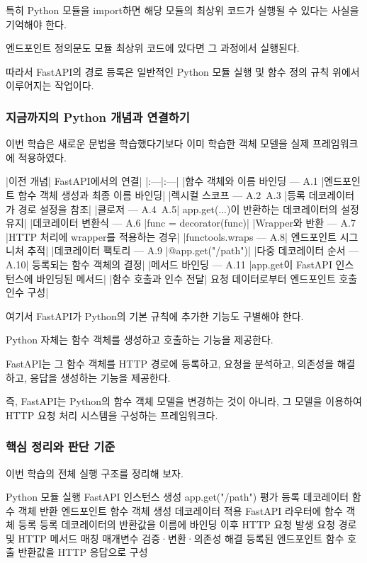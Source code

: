 특히 Python 모듈을 import하면 해당 모듈의 최상위 코드가 실행될 수 있다는 사실을 기억해야 한다.

엔드포인트 정의문도 모듈 최상위 코드에 있다면 그 과정에서 실행된다.

따라서 FastAPI의 경로 등록은 일반적인 Python 모듈 실행 및 함수 정의 규칙 위에서 이루어지는 작업이다.

\subsubsection{지금까지의 Python 개념과 연결하기}

이번 학습은 새로운 문법을 학습했다기보다 이미 학습한 객체 모델을 실제 프레임워크에 적용하였다.

\begin{dhktable}
|이전 개념|	FastAPI에서의 연결|
|:---|:---|
|함수 객체와 이름 바인딩 — A.1	|엔드포인트 함수 객체 생성과 최종 이름 바인딩|
|렉시컬 스코프 — A.2~A.3	|등록 데코레이터가 경로 설정을 참조|
|클로저 — A.4~A.5|	app.get(...)이 반환하는 데코레이터의 설정 유지|
|데코레이터 변환식 — A.6	|func = decorator(func)|
|Wrapper와 반환 — A.7	|HTTP 처리에 wrapper를 적용하는 경우|
|functools.wraps — A.8|	엔드포인트 시그니처 추적|
|데코레이터 팩토리 — A.9	|@app.get("/path")|
|다중 데코레이터 순서 — A.10|	등록되는 함수 객체의 결정|
|메서드 바인딩 — A.11	|app.get이 FastAPI 인스턴스에 바인딩된 메서드|
|함수 호출과 인수 전달|	요청 데이터로부터 엔드포인트 호출 인수 구성|
\end{dhktable}

여기서 FastAPI가 Python의 기본 규칙에 추가한 기능도 구별해야 한다.

Python 자체는 함수 객체를 생성하고 호출하는 기능을 제공한다.

FastAPI는 그 함수 객체를 HTTP 경로에 등록하고, 요청을 분석하고, 의존성을 해결하고, 응답을 생성하는 기능을 제공한다.

즉, FastAPI는 Python의 함수 객체 모델을 변경하는 것이 아니라, 그 모델을 이용하여 HTTP 요청 처리 시스템을 구성하는 프레임워크다.

\subsubsection{핵심 정리와 판단 기준}

이번 학습의 전체 실행 구조를 정리해 보자.

\begin{dhksmry}[centered]
Python 모듈 실행
\da
FastAPI 인스턴스 생성
\da   
app.get("/path") 평가
\da   
등록 데코레이터 함수 객체 반환
\da   
엔드포인트 함수 객체 생성
\da   
데코레이터 적용
\da   
FastAPI 라우터에 함수 객체 등록
\da   
등록 데코레이터의 반환값을 이름에 바인딩
\da
이후 HTTP 요청 발생
\da   
요청 경로 및 HTTP 메서드 매칭
\da   
매개변수 검증·변환·의존성 해결
\da   
등록된 엔드포인트 함수 호출
\da   
반환값을 HTTP 응답으로 구성
\end{dhksmry}

